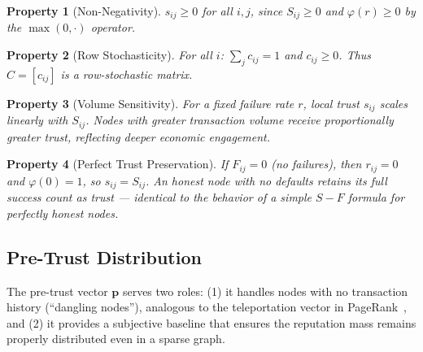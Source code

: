\documentclass[11pt]{article}
\newtheorem{property}{Property}[section]
\begin{document}
\begin{property}[Non-Negativity]
$s_{ij} \geq 0$ for all $i, j$, since $S_{ij} \geq 0$ and $\varphi(r) \geq 0$ by the $\max(0, \cdot)$ operator.
\end{property}

\begin{property}[Row Stochasticity]
For all $i$: $\sum_j c_{ij} = 1$ and $c_{ij} \geq 0$. Thus $C = [c_{ij}]$ is a row-stochastic matrix.
\end{property}

\begin{property}[Volume Sensitivity]
For a fixed failure rate $r$, local trust $s_{ij}$ scales linearly with $S_{ij}$. Nodes with greater transaction volume receive proportionally greater trust, reflecting deeper economic engagement.
\end{property}

\begin{property}[Perfect Trust Preservation]
If $F_{ij} = 0$ (no failures), then $r_{ij} = 0$ and $\varphi(0) = 1$, so $s_{ij} = S_{ij}$. An honest node with no defaults retains its full success count as trust --- identical to the behavior of a simple $S - F$ formula for perfectly honest nodes.
\end{property}

\subsection{Pre-Trust Distribution}

The pre-trust vector $\mathbf{p}$ serves two roles: (1) it handles nodes with no transaction history (``dangling nodes''), analogous to the teleportation vector in PageRank~\cite{page1999}, and (2) it provides a subjective baseline that ensures the reputation mass remains properly distributed even in a sparse graph.
\end{document}
